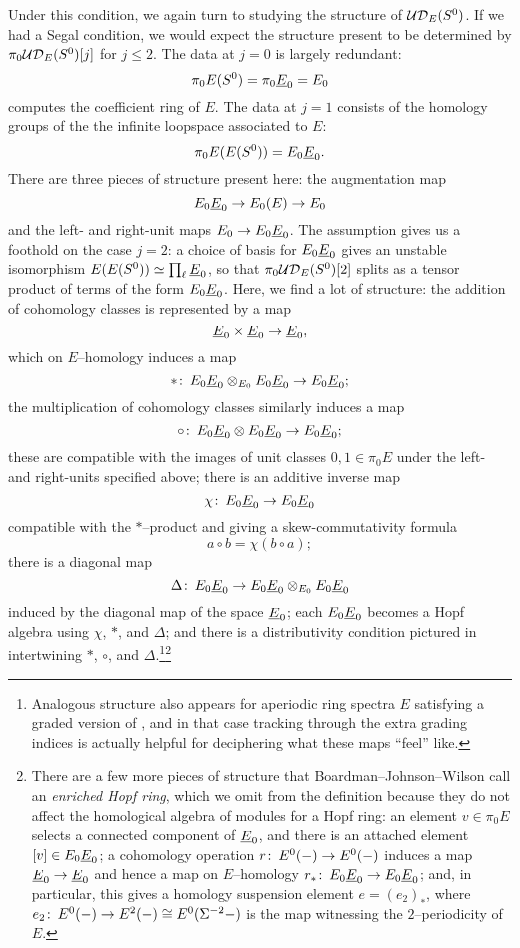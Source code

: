 Under this condition, we again turn to studying the structure of \(\mathcal{UD}_E(S^0)\).  If we had a Segal condition, we would expect the structure present to be determined by \(\pi_0 \mathcal{UD}_E(S^0)[j]\) for \(j \le 2\).  The data at \(j = 0\) is largely redundant: \[\pi_0 E(S^0) = \pi_0 \underline{\smash{E}}_{0} = E_0\] computes the coefficient ring of \(E\).  The data at \(j = 1\) consists of the homology groups of the the infinite loopspace associated to \(E\): \[\pi_0 E(E(S^0)) = E_0 \underline{\smash{E}}_{0}.\]  There are three pieces of structure present here: the augmentation map \[E_0 \underline{\smash{E}}_{0} \to E_0(E) \to E_0\] and the left- and right-unit maps \(E_0 \to E_0 \underline{\smash{E}}_{0}\).  The assumption {\UFH} gives us a foothold on the case \(j = 2\): a choice of basis for \(E_0 \underline{\smash{E}}_{0}\) gives an unstable isomorphism \(E(E(S^0)) \simeq \prod_\ell \underline{\smash{E}}_{0}\), so that \(\pi_0 \mathcal{UD}_E(S^0)[2]\) splits as a tensor product of terms of the form \(E_0 \underline{\smash{E}}_{0}\).  Here, we find a lot of structure: the addition of cohomology classes is represented by a map \[\underline{\smash{E}}_{0} \times \underline{\smash{E}}_{0} \to \underline{\smash{E}}_{0},\] which on \(E\)--homology induces a map \[\ast\colon\thinspace E_0 \underline{\smash{E}}_{0} \otimes_{E_0} E_0 \underline{\smash{E}}_{0} \to E_0 \underline{\smash{E}}_{0};\] the multiplication of cohomology classes similarly induces a map \[\circ\colon\thinspace E_0 \underline{\smash{E}}_{0} \otimes E_0 \underline{\smash{E}}_{0} \to E_0 \underline{\smash{E}}_{0};\] these are compatible with the images of unit classes \(0, 1 \in \pi_0 E\) under the left- and right-units specified above; there is an additive inverse map \[\chi\colon\thinspace E_0 \underline{\smash{E}}_{0} \to E_0 \underline{\smash{E}}_{0}\] compatible with the \(\ast\)--product and giving a skew-commutativity formula \[a \circ b = \chi(b \circ a);\] there is a diagonal map \[\Delta\colon\thinspace E_0 \underline{\smash{E}}_{0} \to E_0 \underline{\smash{E}}_{0} \otimes_{E_0} E_0 \underline{\smash{E}}_{0}\] induced by the diagonal map of the space $\underline{\smash{E}}_{0}$; each \(E_0 \underline{\smash{E}}_{0}\) becomes a Hopf algebra using \(\chi\), \(\ast\), and \(\Delta\); and there is a distributivity condition pictured in  intertwining \(\ast\), \(\circ\), and \(\Delta\).\footnote{Analogous structure also appears for aperiodic ring spectra \(E\) satisfying a graded version of {\UFH}, and in that case tracking through the extra grading indices is actually helpful for deciphering what these maps ``feel'' like.}\footnote{There are a few more pieces of structure that Boardman--Johnson--Wilson call an \textit{enriched Hopf ring}, which we omit from the definition because they do not affect the homological algebra of modules for a Hopf ring: an element \(v \in \pi_0 E\) selects a connected component of \(\underline{\smash{E}}_{0}\), and there is an attached element \([v] \in E_0 \underline{\smash{E}}_{0}\); a cohomology operation \(r\colon\thinspace E^0(-) \to E^0(-)\) induces a map \(\underline{\smash{E}}_{0} \to \underline{\smash{E}}_{0}\) and hence a map on \(E\)--homology \(r_*\colon\thinspace E_0 \underline{\smash{E}}_{0} \to E_0 \underline{\smash{E}}_{0}\); and, in particular, this gives a homology suspension element \(e = (e_2)_*\), where \(e_2\colon\thinspace E^0(-) \to E^2(-) \cong E^0(\Sigma^{-2} -)\) is the map witnessing the \(2\)--periodicity of \(E\).}


